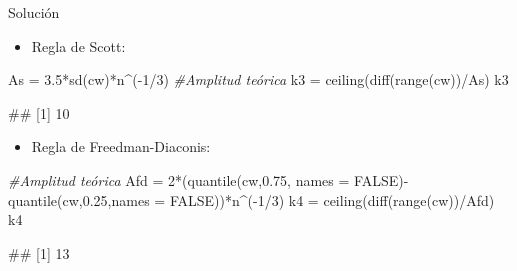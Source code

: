 \documentclass[
  ignorenonframetext,
  aspectratio=169]{beamer}
\newenvironment{Shaded}{\begin{snugshade}}{\end{snugshade}}
\newcommand{\AttributeTok}[1]{\textcolor[rgb]{0.77,0.63,0.00}{#1}}
\newcommand{\CommentTok}[1]{\textcolor[rgb]{0.56,0.35,0.01}{\textit{#1}}}
\newcommand{\ConstantTok}[1]{\textcolor[rgb]{0.00,0.00,0.00}{#1}}
\newcommand{\DecValTok}[1]{\textcolor[rgb]{0.00,0.00,0.81}{#1}}
\newcommand{\FloatTok}[1]{\textcolor[rgb]{0.00,0.00,0.81}{#1}}
\newcommand{\FunctionTok}[1]{\textcolor[rgb]{0.00,0.00,0.00}{#1}}
\newcommand{\NormalTok}[1]{#1}
\newcommand{\OtherTok}[1]{\textcolor[rgb]{0.56,0.35,0.01}{#1}}
\newcommand{\SpecialCharTok}[1]{\textcolor[rgb]{0.00,0.00,0.00}{#1}}
\providecommand{\tightlist}{%
  \setlength{\itemsep}{0pt}\setlength{\parskip}{0pt}}
\let\oldverbatim\verbatim
\let\endoldverbatim\endverbatim
\renewenvironment{verbatim}{\tiny\oldverbatim}{\endoldverbatim}
\begin{document}
\begin{frame}[fragile]{Solución}
\protect\hypertarget{soluciuxf3n-2}{}
\begin{itemize}
\tightlist
\item
  Regla de Scott:
\end{itemize}

\begin{Shaded}
\begin{Highlighting}[]
\NormalTok{As }\OtherTok{=} \FloatTok{3.5}\SpecialCharTok{*}\FunctionTok{sd}\NormalTok{(cw)}\SpecialCharTok{*}\NormalTok{n}\SpecialCharTok{\^{}}\NormalTok{(}\SpecialCharTok{{-}}\DecValTok{1}\SpecialCharTok{/}\DecValTok{3}\NormalTok{) }\CommentTok{\#Amplitud teórica}
\NormalTok{k3 }\OtherTok{=} \FunctionTok{ceiling}\NormalTok{(}\FunctionTok{diff}\NormalTok{(}\FunctionTok{range}\NormalTok{(cw))}\SpecialCharTok{/}\NormalTok{As)}
\NormalTok{k3}
\end{Highlighting}
\end{Shaded}

\begin{verbatim}
## [1] 10
\end{verbatim}

\begin{itemize}
\tightlist
\item
  Regla de Freedman-Diaconis:
\end{itemize}

\begin{Shaded}
\begin{Highlighting}[]
\CommentTok{\#Amplitud teórica}
\NormalTok{Afd }\OtherTok{=} \DecValTok{2}\SpecialCharTok{*}\NormalTok{(}\FunctionTok{quantile}\NormalTok{(cw,}\FloatTok{0.75}\NormalTok{, }\AttributeTok{names =} \ConstantTok{FALSE}\NormalTok{)}\SpecialCharTok{{-}}
           \FunctionTok{quantile}\NormalTok{(cw,}\FloatTok{0.25}\NormalTok{,}\AttributeTok{names =} \ConstantTok{FALSE}\NormalTok{))}\SpecialCharTok{*}\NormalTok{n}\SpecialCharTok{\^{}}\NormalTok{(}\SpecialCharTok{{-}}\DecValTok{1}\SpecialCharTok{/}\DecValTok{3}\NormalTok{) }
\NormalTok{k4 }\OtherTok{=} \FunctionTok{ceiling}\NormalTok{(}\FunctionTok{diff}\NormalTok{(}\FunctionTok{range}\NormalTok{(cw))}\SpecialCharTok{/}\NormalTok{Afd)}
\NormalTok{k4}
\end{Highlighting}
\end{Shaded}

\begin{verbatim}
## [1] 13
\end{verbatim}
\end{frame}
\end{document}

